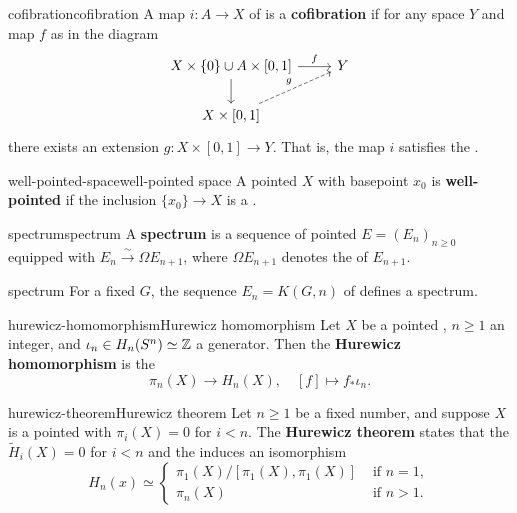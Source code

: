 \begin{topic}{cofibration}{cofibration}
    A map $i : A \to X$ of  is a \textbf{cofibration} if for any space $Y$ and map $f$ as in the diagram
    \[ \begin{tikzcd} X \times \{ 0 \} \cup A \times [0, 1] \arrow{r}{f} \arrow{d} & Y \\ X \times [0, 1] \arrow[dashed]{ur}{g} \end{tikzcd} \]
    there exists an extension $g : X \times [0, 1] \to Y$. That is, the map $i$ satisfies the .
\end{topic}

\begin{topic}{well-pointed-space}{well-pointed space}
    A pointed  $X$ with basepoint $x_0$ is \textbf{well-pointed} if the inclusion $\{ x_0 \} \to X$ is a .
\end{topic}

\begin{topic}{spectrum}{spectrum}
    A \textbf{spectrum} is a sequence of pointed  $E = (E_n)_{n \ge 0}$ equipped with  $E_n \xrightarrow{\sim} \Omega E_{n + 1}$, where $\Omega E_{n + 1}$ denotes the  of $E_{n + 1}$.
\end{topic}

\begin{example}{spectrum}
    For a fixed  $G$, the sequence $E_n = K(G, n)$ of  defines a spectrum.
\end{example}

\begin{topic}{hurewicz-homomorphism}{Hurewicz homomorphism}
    Let $X$ be a pointed , $n \ge 1$ an integer, and $\iota_n \in H_n(S^n) \simeq \mathbb{Z}$ a generator. Then the \textbf{Hurewicz homomorphism} is the 
    \[ \pi_n(X) \to H_n(X), \quad [f] \mapsto f_* \iota_n . \]
\end{topic}

\begin{topic}{hurewicz-theorem}{Hurewicz theorem}
    Let $n \ge 1$ be a fixed number, and suppose $X$ is a pointed  with $\pi_i(X) = 0$ for $i < n$. The \textbf{Hurewicz theorem} states that the  $\tilde{H}_i(X) = 0$ for $i < n$ and the  induces an isomorphism
    \[ H_n(x) \simeq \left\{ \begin{array}{ll} \pi_1(X) / [\pi_1(X), \pi_1(X)] & \text{ if } n = 1 , \\ \pi_n(X) & \text{ if } n > 1 . \end{array} \right. \]
\end{topic}

